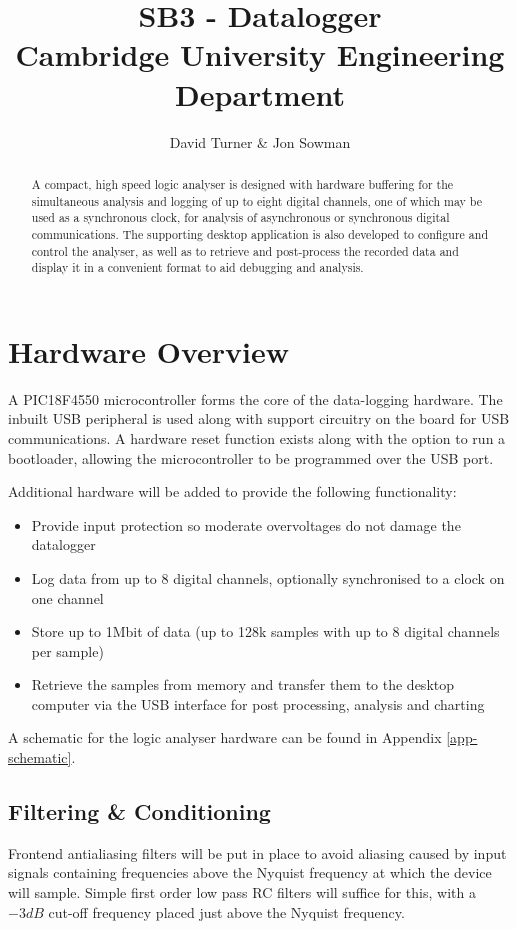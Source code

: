 \documentclass[11pt]{article}
\title{SB3 - Datalogger\\Cambridge University Engineering Department}
\author{David Turner \& Jon Sowman}
\begin{document}
    \maketitle
	
\begin{abstract}
    A compact, high speed logic analyser is designed with hardware buffering for the simultaneous analysis and logging of up to eight digital channels, one of which may be used as a synchronous clock, for analysis of asynchronous or synchronous digital communications. The supporting desktop application is also developed to configure and control the analyser, as well as to retrieve and post-process the recorded data and display it in a convenient format to aid debugging and analysis.
\end{abstract}

\section{Hardware Overview}
    A PIC18F4550 microcontroller forms the core of the data-logging hardware. The inbuilt USB peripheral is used along with support circuitry on the board for USB communications. A hardware reset function exists along with the option to run a bootloader, allowing the microcontroller to be programmed over the USB port.

    Additional hardware will be added to provide the following functionality:
    \begin{itemize}
    \item Provide input protection so moderate overvoltages do not damage the datalogger
    \item Log data from up to 8 digital channels, optionally synchronised to a clock on one channel
    \item Store up to 1Mbit of data (up to 128k samples with up to 8 digital channels per sample)
    \item Retrieve the samples from memory and transfer them to the desktop computer via the USB interface for post processing, analysis and charting
    \end{itemize}

    A schematic for the logic analyser hardware can be found in Appendix
    \ref{app-schematic}.

    \subsection{Filtering \& Conditioning}
    Frontend antialiasing filters will be put in place to avoid aliasing caused by input signals containing frequencies above the Nyquist frequency at which the device will sample. Simple first order low pass RC filters will suffice for this, with a $-3dB$ cut-off frequency placed just above the Nyquist frequency.
\end{document}
